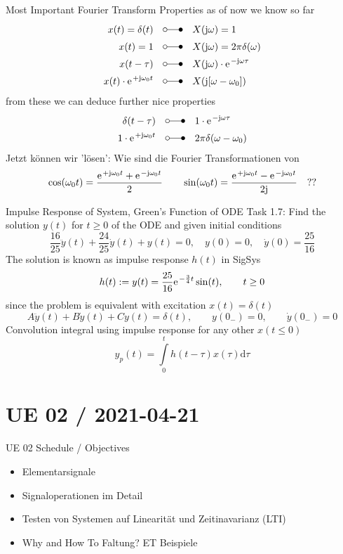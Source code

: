 \documentclass[mathserif, aspectratio=43]{intbeamer}
\newcommand\fsd{\mathrm{d}} %
\begin{document}
\begin{frame}{Most Important Fourier Transform Properties}
%
as of now we know so far
\begin{align*}
x(t)= \delta(t) &\quad \laplace \quad X(\im\omega)=1\\
x(t)= 1 &\quad \laplace \quad X(\im\omega)=2\pi \delta(\omega)\\
x(t - \tau) & \quad \laplace \quad X(\im\omega) \cdot \e^{-\im\omega \tau}\\
x(t) \cdot \e^{+\im\omega_0 t} & \quad \laplace \quad X(\im[\omega-\omega_0])
\end{align*}
%
from these we can deduce further nice properties
\begin{align*}
\delta(t-\tau)& \quad \laplace \quad 1 \cdot \e^{-\im\omega \tau}\\
1 \cdot \e^{+\im\omega_0 t} & \quad \laplace \quad 2\pi\delta(\omega-\omega_0)
\end{align*}
%
Jetzt können wir 'lösen': Wie sind die Fourier Transformationen von
\begin{align*}
\cos(\omega_0 t) = \frac{\e^{+\im\omega_0 t}+\e^{-\im\omega_0 t}}{2}\qquad
\sin(\omega_0 t) = \frac{\e^{+\im\omega_0 t}-\e^{-\im\omega_0 t}}{2\im}\quad??
\end{align*}
%
\end{frame}



\begin{frame}{Impulse Response of System, Green's Function of ODE}
Task 1.7: Find the solution $y(t)$ for $t\geq 0$ of the ODE and given initial conditions
$$\frac{16}{25} \ddot{y}(t) + \frac{24}{25} \dot{y}(t) + y(t) = 0,
\quad y(0)=0,\quad \dot{y}(0)=\frac{25}{16}$$
The solution is known as impulse response $h(t)$ in SigSys
$$h(t) := y(t) = \frac{25}{16} \e^{-\frac{3}{4} t} \sin(t), \qquad t\geq 0$$
since the problem is equivalent with excitation $x(t) = \delta(t)$
$$A \ddot{y}(t) + B \dot{y}(t) + C y(t) = \delta(t),\qquad {y}(0_-) = 0,\qquad \dot{y}(0_-) = 0$$
%
Convolution integral using impulse response for any other $x(t \leq 0)$
$$y_p(t) = \int\limits_{0}^{t} h(t-\tau) x(\tau) \fsd \tau$$
%
\end{frame}






\section{UE 02 / 2021-04-21}
\begin{frame}{UE 02 Schedule / Objectives}

\begin{itemize}
\item Elementarsignale
\item Signaloperationen im Detail
\item Testen von Systemen auf Linearität und Zeitinavarianz (LTI)
\item Why and How To Faltung? ET Beispiele
\end{itemize}

\end{frame}
\end{document}
